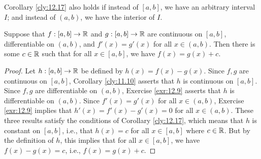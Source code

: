\documentclass[../main.tex]{subfiles}
\begin{document}
\begin{remark}\label{rmk:12.18}
    Corollary \ref{cly:12.17} also holds if instead of $[a,b]$, we have an arbitrary interval $I$; and instead of $(a,b)$, we have the interior of $I$.
\end{remark}

\begin{corollary}\label{cly:12.19}
    Suppose that $f:[a,b]\to\mathbb{R}$ and $g:[a,b]\to\mathbb{R}$ are continuous on $[a,b]$, differentiable on $(a,b)$, and $f'(x)=g'(x)$ for all $x\in(a,b)$. Then there is some $c\in\mathbb{R}$ such that for all $x\in[a,b]$, we have $f(x)=g(x)+c$.
    \begin{proof}
        Let $h:[a,b]\to\mathbb{R}$ be defined by $h(x)=f(x)-g(x)$. Since $f,g$ are continuous on $[a,b]$, Corollary \ref{cly:11.10} asserts that $h$ is continuous on $[a,b]$. Since $f,g$ are differentiable on $(a,b)$, Exercise \ref{exr:12.9} asserts that $h$ is differentiable on $(a,b)$. Since $f'(x)=g'(x)$ for all $x\in(a,b)$, Exercise \ref{exr:12.9} implies that $h'(x)=f'(x)-g'(x)=0$ for all $x\in(a,b)$. These three results satisfy the conditions of Corollary \ref{cly:12.17}, which means that $h$ is constant on $[a,b]$, i.e., that $h(x)=c$ for all $x\in[a,b]$ where $c\in\mathbb{R}$. But by the definition of $h$, this implies that for all $x\in[a,b]$, we have $f(x)-g(x)=c$, i.e., $f(x)=g(x)+c$.
    \end{proof}
\end{corollary}
\end{document}
